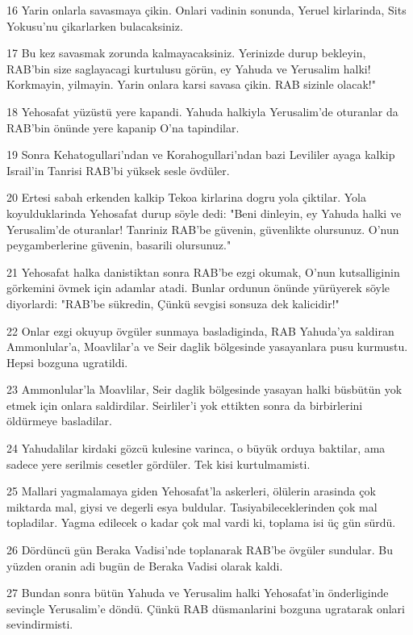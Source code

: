 \par 16 Yarin onlarla savasmaya çikin. Onlari vadinin sonunda, Yeruel kirlarinda, Sits Yokusu'nu çikarlarken bulacaksiniz.
\par 17 Bu kez savasmak zorunda kalmayacaksiniz. Yerinizde durup bekleyin, RAB'bin size saglayacagi kurtulusu görün, ey Yahuda ve Yerusalim halki! Korkmayin, yilmayin. Yarin onlara karsi savasa çikin. RAB sizinle olacak!"
\par 18 Yehosafat yüzüstü yere kapandi. Yahuda halkiyla Yerusalim'de oturanlar da RAB'bin önünde yere kapanip O'na tapindilar.
\par 19 Sonra Kehatogullari'ndan ve Korahogullari'ndan bazi Levililer ayaga kalkip Israil'in Tanrisi RAB'bi yüksek sesle övdüler.
\par 20 Ertesi sabah erkenden kalkip Tekoa kirlarina dogru yola çiktilar. Yola koyulduklarinda Yehosafat durup söyle dedi: "Beni dinleyin, ey Yahuda halki ve Yerusalim'de oturanlar! Tanriniz RAB'be güvenin, güvenlikte olursunuz. O'nun peygamberlerine güvenin, basarili olursunuz."
\par 21 Yehosafat halka danistiktan sonra RAB'be ezgi okumak, O'nun kutsalliginin görkemini övmek için adamlar atadi. Bunlar ordunun önünde yürüyerek söyle diyorlardi: "RAB'be sükredin, Çünkü sevgisi sonsuza dek kalicidir!"
\par 22 Onlar ezgi okuyup övgüler sunmaya basladiginda, RAB Yahuda'ya saldiran Ammonlular'a, Moavlilar'a ve Seir daglik bölgesinde yasayanlara pusu kurmustu. Hepsi bozguna ugratildi.
\par 23 Ammonlular'la Moavlilar, Seir daglik bölgesinde yasayan halki büsbütün yok etmek için onlara saldirdilar. Seirliler'i yok ettikten sonra da birbirlerini öldürmeye basladilar.
\par 24 Yahudalilar kirdaki gözcü kulesine varinca, o büyük orduya baktilar, ama sadece yere serilmis cesetler gördüler. Tek kisi kurtulmamisti.
\par 25 Mallari yagmalamaya giden Yehosafat'la askerleri, ölülerin arasinda çok miktarda mal, giysi ve degerli esya buldular. Tasiyabileceklerinden çok mal topladilar. Yagma edilecek o kadar çok mal vardi ki, toplama isi üç gün sürdü.
\par 26 Dördüncü gün Beraka Vadisi'nde toplanarak RAB'be övgüler sundular. Bu yüzden oranin adi bugün de Beraka Vadisi olarak kaldi.
\par 27 Bundan sonra bütün Yahuda ve Yerusalim halki Yehosafat'in önderliginde sevinçle Yerusalim'e döndü. Çünkü RAB düsmanlarini bozguna ugratarak onlari sevindirmisti.
